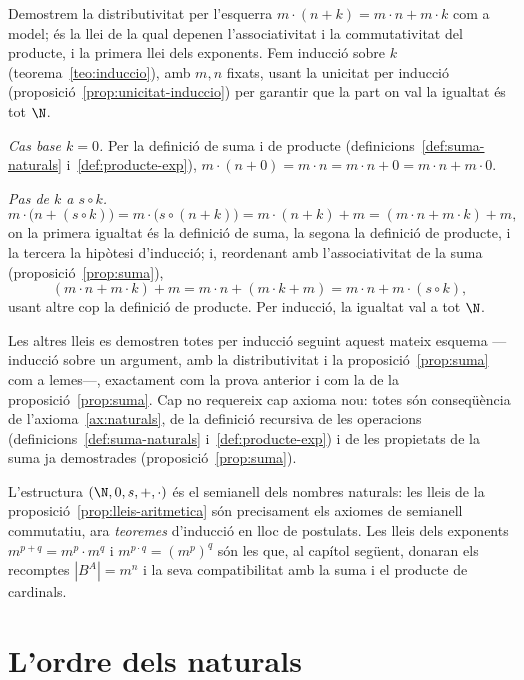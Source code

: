 \begin{prova}
Demostrem la distributivitat per l'esquerra
\(m\cdot(n+k)=m\cdot n+m\cdot k\) com a model; és la llei de la qual
depenen l'associativitat i la commutativitat del producte, i la primera
llei dels exponents. Fem inducció sobre \(k\)
(teorema~\ref{teo:induccio}), amb \(m,n\) fixats, usant la unicitat per
inducció (proposició~\ref{prop:unicitat-induccio}) per garantir que la
part on val la igualtat és tot \(\N\).

\emph{Cas base \(k=0\).} Per la definició de suma i de producte
(definicions~\ref{def:suma-naturals} i~\ref{def:producte-exp}),
\(m\cdot(n+0)=m\cdot n=m\cdot n+0=m\cdot n+m\cdot 0\).

\emph{Pas de \(k\) a \(s\circ k\).}
\[
m\cdot\bigl(n+(s\circ k)\bigr)
=m\cdot\bigl(s\circ(n+k)\bigr)
=m\cdot(n+k)+m
=(m\cdot n+m\cdot k)+m,
\]
on la primera igualtat és la definició de suma, la segona la definició de
producte, i la tercera la hipòtesi d'inducció; i, reordenant amb
l'associativitat de la suma (proposició~\ref{prop:suma}),
\[
(m\cdot n+m\cdot k)+m=m\cdot n+(m\cdot k+m)=m\cdot n+m\cdot(s\circ k),
\]
usant altre cop la definició de producte. Per inducció, la igualtat val a
tot \(\N\).

Les altres lleis es demostren totes per inducció seguint aquest mateix
esquema ---inducció sobre un argument, amb la distributivitat i la
proposició~\ref{prop:suma} com a lemes---, exactament com la prova
anterior i com la de la proposició~\ref{prop:suma}. Cap no requereix cap
axioma nou: totes són conseqüència de l'axioma~\ref{ax:naturals}, de la
definició recursiva de les operacions (definicions~\ref{def:suma-naturals}
i~\ref{def:producte-exp}) i de les propietats de la suma ja demostrades
(proposició~\ref{prop:suma}).
\end{prova}

\begin{observacio}\label{obs:lleis-classica}
L'estructura \((\N,0,s,+,\cdot)\) és el semianell dels nombres naturals:
les lleis de la proposició~\ref{prop:lleis-aritmetica} són precisament els
axiomes de semianell commutatiu, ara \emph{teoremes} d'inducció en lloc de
postulats. Les lleis dels exponents \(m^{p+q}=m^{p}\cdot m^{q}\) i
\(m^{p\cdot q}=(m^{p})^{q}\) són les que, al capítol següent, donaran els
recomptes \(|B^{A}|=m^{n}\) i la seva compatibilitat amb la suma i el
producte de cardinals.
\end{observacio}

\section{L'ordre dels naturals}\label{sec:ordre-naturals}

